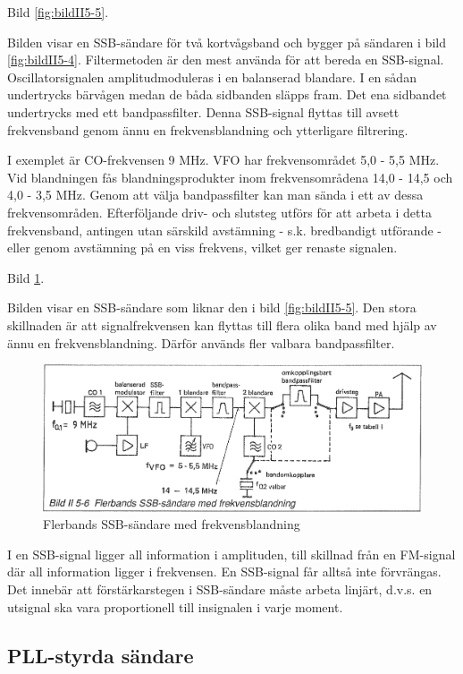 Bild \ref{fig:bildII5-5}.

Bilden visar en SSB-sändare för två kortvågsband och bygger på
sändaren i bild \ref{fig:bildII5-4}.  Filtermetoden är den mest använda för att bereda
en SSB-signal. Oscillatorsignalen amplitudmoduleras i en balanserad
blandare. I en sådan undertrycks bärvågen medan de båda sidbanden
släpps fram. Det ena sidbandet undertrycks med ett
bandpassfilter. Denna SSB-signal flyttas till avsett frekvensband
genom ännu en frekvensblandning och ytterligare filtrering.

I exemplet är CO-frekvensen 9 MHz. VFO har frekvensområdet 5,0 - 5,5
MHz. Vid blandningen fås blandningsprodukter inom frekvensområdena
14,0 - 14,5 och 4,0 - 3,5 MHz. Genom att välja bandpassfilter kan man
sända i ett av dessa frekvensområden.  Efterföljande driv- och
slutsteg utförs för att arbeta i detta frekvensband, antingen utan
särskild avstämning - s.k. bredbandigt utförande - eller genom
avstämning på en viss frekvens, vilket ger renaste signalen.

Bild \ref{fig:bildII5-6}.

Bilden visar en SSB-sändare som liknar den i bild \ref{fig:bildII5-5}. Den stora
skillnaden är att signalfrekvensen kan flyttas till flera olika band
med hjälp av ännu en frekvensblandning.  Därför används fler valbara
bandpassfilter.

\begin{figure}
  \includegraphics[width=\textwidth]{images/bild_2_5-06}
  \caption{Flerbands SSB-sändare med frekvensblandning}
  \label{fig:bildII5-6}
\end{figure}

I en SSB-signal ligger all information i amplituden, till skillnad
från en FM-signal där all information ligger i frekvensen. En
SSB-signal får alltså inte förvrängas. Det innebär att
förstärkarstegen i SSB-sändare måste arbeta linjärt, d.v.s. en
utsignal ska vara proportionell till insignalen i varje moment.

\subsection{PLL-styrda sändare}

